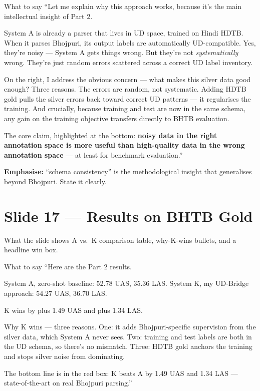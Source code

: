 \documentclass[11pt]{article}
\begin{document}
\begin{pitchbox}{What to say}
``Let me explain why this approach works, because it's the main intellectual insight of Part 2.

System A is already a parser that lives in UD space, trained on Hindi HDTB. When it parses Bhojpuri, its output labels are automatically UD-compatible. Yes, they're noisy --- System A gets things wrong. But they're not \textit{systematically} wrong. They're just random errors scattered across a correct UD label inventory.

On the right, I address the obvious concern --- what makes this silver data good enough? Three reasons. The errors are random, not systematic. Adding HDTB gold pulls the silver errors back toward correct UD patterns --- it regularises the training. And crucially, because training and test are now in the same schema, any gain on the training objective transfers directly to BHTB evaluation.

The core claim, highlighted at the bottom: \textbf{noisy data in the right annotation space is more useful than high-quality data in the wrong annotation space} --- at least for benchmark evaluation.''
\end{pitchbox}

\begin{tipbox}
\textbf{Emphasise:} ``schema consistency'' is the methodological insight that generalises beyond Bhojpuri. State it clearly.
\end{tipbox}

\section{Slide 17 --- Results on BHTB Gold}

\begin{pitchbox}{What the slide shows}
A vs.\ K comparison table, why-K-wins bullets, and a headline win box.
\end{pitchbox}

\begin{pitchbox}{What to say}
``Here are the Part 2 results.

System A, zero-shot baseline: 52.78 UAS, 35.36 LAS.
System K, my UD-Bridge approach: 54.27 UAS, 36.70 LAS.

K wins by plus 1.49 UAS and plus 1.34 LAS.

Why K wins --- three reasons. One: it adds Bhojpuri-specific supervision from the silver data, which System A never sees. Two: training and test labels are both in the UD schema, so there's no mismatch. Three: HDTB gold anchors the training and stops silver noise from dominating.

The bottom line is in the red box: K beats A by 1.49 UAS and 1.34 LAS --- state-of-the-art on real Bhojpuri parsing.''
\end{pitchbox}
\end{document}
